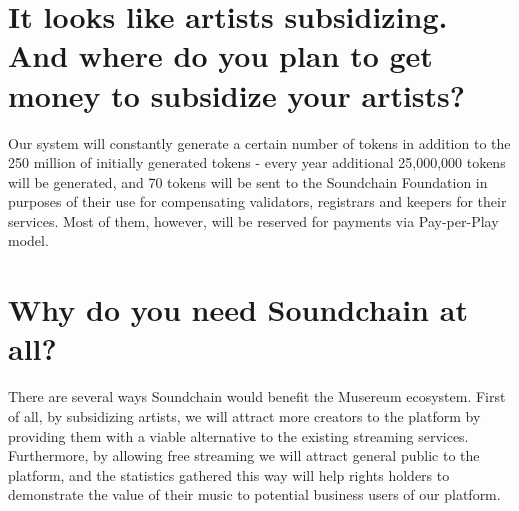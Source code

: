 \documentclass[12pt]{report}
\begin{document}
\section{It looks like artists subsidizing. And where do you plan to get money to subsidize your artists?}
\label{soundchain-subsidizing}
Our system will constantly generate a certain number of tokens in
addition to the 250 million of initially generated tokens - every year
additional 25,000,000 tokens will be generated, and 70%
tokens will be sent to the Soundchain Foundation in purposes of their
use for compensating validators, registrars and keepers for their
services. Most of them, however, will be reserved for payments via
Pay-per-Play model.

\section{Why do you need Soundchain at all?}
\label{soundchain-reasons}
There are several ways Soundchain would benefit the Musereum
ecosystem. First of all, by subsidizing artists, we will attract more
creators to the platform by providing them with a viable alternative
to the existing streaming services. Furthermore, by allowing free
streaming we will attract general public to the platform, and the
statistics gathered this way will help rights holders to demonstrate
the value of their music to potential business users of our platform.
\end{document}
